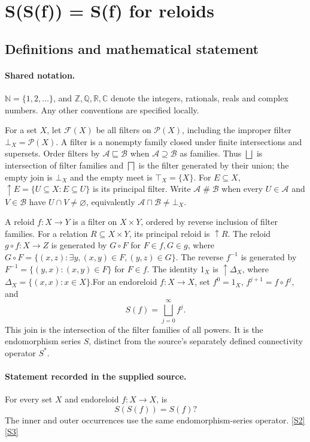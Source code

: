\documentclass[11pt]{article}
\newcommand{\sref}[2]{\hyperlink{source:#1:#2}{[S#2]}}
\begin{document}
\section{S(S(f)) = S(f) for reloids}\label{statement}

\subsection{Definitions and mathematical statement}

\paragraph{Shared notation.}$\mathbb N=\{1,2,\ldots\}$, and $\mathbb Z,\mathbb Q,\mathbb R,\mathbb C$ denote the integers, rationals, reals and complex numbers. Any other conventions are specified locally.


For a set $X$, let $\mathcal F(X)$ be all filters on $\mathcal P(X)$, including the improper filter $\bot_X=\mathcal P(X)$. A filter is a nonempty family closed under finite intersections and supersets. Order filters by $\mathcal A\sqsubseteq\mathcal B$ when $\mathcal A\supseteq\mathcal B$ as families. Thus $\bigsqcup$ is intersection of filter families and $\bigsqcap$ is the filter generated by their union; the empty join is $\bot_X$ and the empty meet is $\top_X=\{X\}$. For $E\subseteq X$, $\uparrow E=\{U\subseteq X:E\subseteq U\}$ is its principal filter. Write $\mathcal A\mathrel{\#}\mathcal B$ when every $U\in\mathcal A$ and $V\in\mathcal B$ have $U\cap V\ne\varnothing$, equivalently $\mathcal A\sqcap\mathcal B\ne\bot_X$.

A reloid $f:X\to Y$ is a filter on $X\times Y$, ordered by reverse inclusion of filter families. For a relation $R\subseteq X\times Y$, its principal reloid is $\uparrow R$. The reloid $g\circ f:X\to Z$ is generated by $G\circ F$ for $F\in f,G\in g$, where $G\circ F=\{(x,z):\exists y,(x,y)\in F,(y,z)\in G\}$. The reverse $f^{-1}$ is generated by $F^{-1}=\{(y,x):(x,y)\in F\}$ for $F\in f$. The identity $1_X$ is $\uparrow\Delta_X$, where $\Delta_X=\{(x,x):x\in X\}$.For an endoreloid $f:X\to X$, set $f^0=1_X$, $f^{j+1}=f\circ f^j$, and
\[
 S(f)=\bigsqcup_{j=0}^{\infty}f^j.
\]
This join is the intersection of the filter families of all powers. It is the endomorphism series $S$, distinct from the source’s separately defined connectivity operator $S^*$.
\paragraph{Statement recorded in the supplied source.}
For every set $X$ and endoreloid $f:X\to X$, is
\[
 S(S(f))=S(f)?
\]
The inner and outer occurrences use the same endomorphism-series operator. \sref{statement}{2}\sref{statement}{3}
\end{document}
